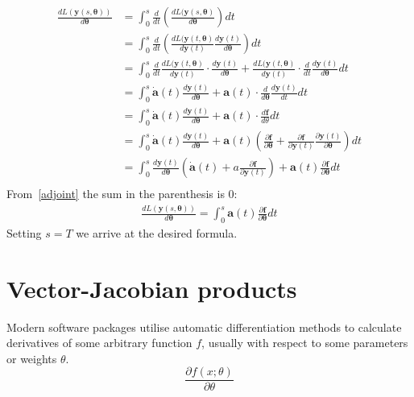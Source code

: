 \documentclass[11pt]{article}
\begin{document}
    \begin{align*}
        \frac{ d L(\bm{y}(s, \bm{\theta})) }{ d \bm{\theta} }
        &= \int_0^s \frac{d}{dt} \left( \frac{ d L(\bm{y}(s, \bm{\theta})}{ d \bm{\theta}} \right) dt \\
        &= \int_0^s \frac{d}{dt} \left( \frac{ d L(\bm{y}(t, \bm{\theta})}{ d \bm{y}(t)} \frac{d \bm{y}(t)}{d\bm{\theta}} \right) dt \\
        &= \int_0^s
        \frac{d}{dt} \frac{ d L(\bm{y}(t, \bm{\theta})}{ d \bm{y}(t)} \cdot \frac{d \bm{y}(t)}{d\bm{\theta}}
        +
        \frac{ d L(\bm{y}(t, \bm{\theta})}{ d \bm{y}(t)} \cdot \frac{d}{dt} \frac{d \bm{y}(t)}{d\bm{\theta}}
        dt \\
        &= \int_0^s
        \dot{\bm{a}}(t) \frac{d \bm{y}(t)}{d\bm{\theta}}
        +
        \bm{a}(t) \cdot \frac{d}{d\bm{\theta}} \frac{d \bm{y}(t)}{dt}
        dt \\
        &= \int_0^s
        \dot{\bm{a}}(t) \frac{d \bm{y}(t)}{d\bm{\theta}}
        +
        \bm{a}(t) \cdot \frac{d\bm{f}}{d\theta}
        dt \\
        &= \int_0^s
        \dot{\bm{a}}(t) \frac{d \bm{y}(t)}{d\bm{\theta}}
        +
        \bm{a}(t) \left( \frac{\partial \bm{f}}{\partial \bm{\theta}}
        +
        \frac{\partial \bm{f}}{\partial \bm{y}(t)} \frac{\partial \bm{y}(t)}{\partial \bm{\theta}}\right)
        dt \\
        &= \int_0^s
        \frac{d \bm{y}(t)}{d\bm{\theta}}
        \left( \dot{\bm{a}}(t) + a\frac{\partial \bm{f}}{\partial \bm{y}(t)} \right)
        +
        \bm{a}(t) \frac{\partial \bm{f}}{\partial \bm{\theta}}
        dt \\
    \end{align*}
    From~\eqref{adjoint} the sum in the parenthesis is 0:
    \begin{align}
        \frac{ d L(\bm{y}(s, \bm{\theta})) }{ d \bm{\theta} }
        = \int_0^s
        \bm{a}(t) \frac{\partial \bm{f}}{\partial \bm{\theta}}
        dt
    \end{align}
    Setting $s=T$ we arrive at the desired formula.


    \section{Vector-Jacobian products}
    Modern software packages utilise automatic differentiation methods to calculate derivatives of some arbitrary function $f$, usually with respect to some parameters or weights $\theta$.
    \begin{equation}
        \frac{\partial f(x; \theta)}{ \partial \theta}
    \end{equation}
\end{document}
